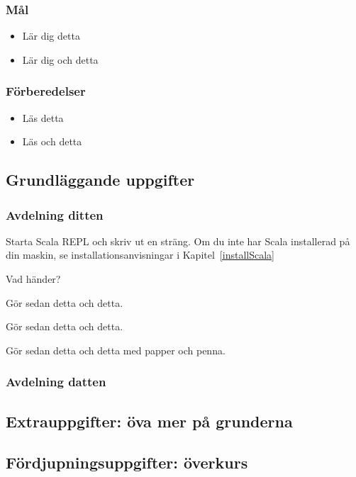 

\subsubsection{Mål}
\begin{itemize}[nosep]
\item Lär dig detta
\item Lär dig och detta
\end{itemize}

\subsubsection{Förberedelser}
\begin{itemize}[nosep]
\item Läs detta
\item Läs och detta
\end{itemize}

\subsection{Grundläggande uppgifter}

\subsubsection{Avdelning ditten}

\Task Starta Scala REPL och skriv ut en sträng. Om du inte har Scala installerad på din maskin, se installationsanvisningar i Kapitel~\ref{installScala}


\noindent Vad händer?


\Task Gör sedan detta och detta. 

\Task Gör sedan detta och detta. 

\TaskPencil Gör sedan detta och detta med papper och penna.

\subsubsection{Avdelning datten}
\lipsum[7]

\subsection{Extrauppgifter: öva mer på grunderna}
\lipsum[2]


\subsection{Fördjupningsuppgifter: överkurs}
\lipsum[2]